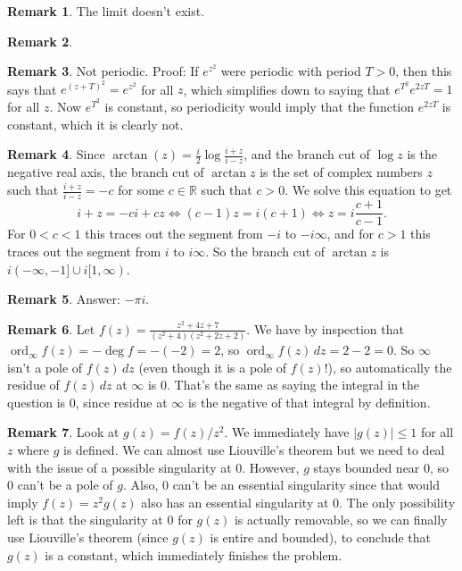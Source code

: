 \documentclass[11pt,oneside]{amsart}
\theoremstyle{definition}
\newtheorem{remark}{Remark}
\newcommand{\bR}{\mathbb{R}}
\DeclareMathOperator{\ord}{ord}
\begin{document}
\begin{remark} %
  The limit doesn't exist.
\end{remark}

\begin{remark} %
\end{remark}

\begin{remark} %
  Not periodic. Proof: If $e^{z^2}$ were periodic with period $T>0$, then this says that $e^{(z+T)^2}=e^{z^2}$ for all $z$, which simplifies down to saying that $e^{T^2}e^{2zT}=1$ for all $z$. Now $e^{T^2}$ is constant, so periodicity would imply that the function $e^{2zT}$ is constant, which it is clearly not.
\end{remark}

\begin{remark} %
  Since $\arctan(z)=\frac i2\log\frac{i+z}{i-z}$, and the branch cut of $\log z$ is the negative real axis, the branch cut of $\arctan z$ is the set of complex numbers $z$ such that $\frac{i+z}{i-z}=-c$ for some $c\in\bR$ such that $c>0$. We solve this equation to get
  \[i+z=-ci+cz\iff (c-1)z=i(c+1)\iff z= i\frac{c+1}{c-1}.\]
  For $0<c<1$ this traces out the segment from $-i$ to $-i\infty$, and for $c>1$ this traces out the segment from $i$ to $i\infty$. So the branch cut of $\arctan z$ is $i(-\infty,-1]\cup i[1,\infty)$.
\end{remark}

\begin{remark} %
  Answer: $-\pi i$.
\end{remark}

\begin{remark} %
  Let $f(z)=\frac{z^2+4z+7}{(z^2+4)(z^2+2z+2)}$. We have by inspection that $\ord_{\infty}f(z)=-\deg f=-(-2)=2$, so $\ord_\infty f(z)\,dz=2-2=0$. So $\infty$ isn't a pole of $f(z)\,dz$ (even though it is a pole of $f(z)$!), so automatically the residue of $f(z)\,dz$ at $\infty$ is 0. That's the same as saying the integral in the question is 0, since residue at $\infty$ is the negative of that integral by definition.
\end{remark}

\begin{remark} %
  Look at $g(z)=f(z)/z^2$. We immediately have $|g(z)|\leq 1$ for all $z$ where $g$ is defined. We can almost use Liouville's theorem but we need to deal with the issue of a possible singularity at 0. However, $g$ stays bounded near 0, so 0 can't be a pole of $g$. Also, 0 can't be an essential singularity since that would imply $f(z)=z^2 g(z)$ also has an essential singularity at 0. The only possibility left is that the singularity at 0 for $g(z)$ is actually removable, so we can finally use Liouville's theorem (since $g(z)$ is entire and bounded), to conclude that $g(z)$ is a constant, which immediately finishes the problem.
\end{remark}
\end{document}
